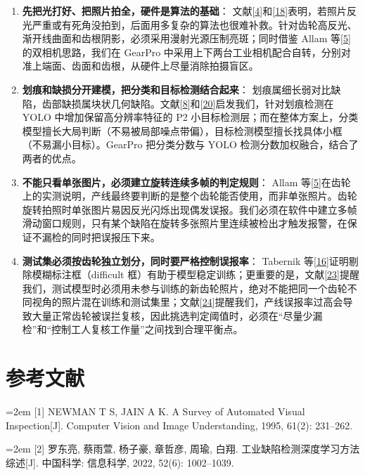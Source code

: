 \begin{enumerate}
\item \textbf{先把光打好、把照片拍全，硬件是算法的基础}：
文献[\hyperlink{ref:4}{4}]和[\hyperlink{ref:18}{18}]表明，若照片反光严重或有死角没拍到，后面用多复杂的算法也很难补救。针对齿轮高反光、渐开线曲面和齿根阴影，必须采用漫射光源压制亮斑；同时借鉴 Allam 等[\hyperlink{ref:5}{5}]的双相机思路，我们在 GearPro 中采用上下两台工业相机配合自转，分别对准上端面、齿面和齿根，从硬件上尽量消除拍摄盲区。
\item \textbf{划痕和缺损分开建模，把分类和目标检测结合起来}：
划痕属细长弱对比缺陷，齿部缺损属块状几何缺陷。文献[\hyperlink{ref:8}{8}]和[\hyperlink{ref:20}{20}]启发我们，针对划痕检测在 YOLO 中增加保留高分辨率特征的 P2 小目标检测层；而在整体方案上，分类模型擅长大局判断（不易被局部噪点带偏），目标检测模型擅长找具体小框（不易漏小目标）。GearPro 把分类分数与 YOLO 检测分数加权融合，结合了两者的优点。
\item \textbf{不能只看单张图片，必须建立旋转连续多帧的判定规则}：
Allam 等[\hyperlink{ref:5}{5}]在齿轮上的实测说明，产线最终要判断的是整个齿轮能否使用，而非单张照片。齿轮旋转拍照时单张图片易因反光闪烁出现偶发误报。我们必须在软件中建立多帧滑动窗口规则，只有某个缺陷在旋转多张照片里连续被检出才触发报警，在保证不漏检的同时把误报压下来。
\item \textbf{测试集必须按齿轮独立划分，同时要严格控制误报率}：
Tabernik 等[\hyperlink{ref:16}{16}]证明剔除模糊标注框（difficult 框）有助于模型稳定训练；更重要的是，文献[\hyperlink{ref:23}{23}]提醒我们，测试模型时必须用未参与训练的新齿轮照片，绝对不能把同一个齿轮不同视角的照片混在训练和测试集里；文献[\hyperlink{ref:24}{24}]提醒我们，产线误报率过高会导致大量正常齿轮被误拦复核，因此挑选判定阈值时，必须在“尽量少漏检”和“控制工人复核工作量”之间找到合理平衡点。

\end{enumerate}

\begingroup
{}
\section*{参考文献}

{\small\noindent\hangindent=2em \hypertarget{ref:1}{}[1] NEWMAN T S, JAIN A K. A Survey of Automated Visual Inspection[J]. Computer Vision and Image Understanding, 1995, 61(2): 231–262.\par}

{\small\noindent\hangindent=2em \hypertarget{ref:2}{}[2] 罗东亮, 蔡雨萱, 杨子豪, 章哲彦, 周瑜, 白翔. 工业缺陷检测深度学习方法综述[J]. 中国科学: 信息科学, 2022, 52(6): 1002–1039.\par}

